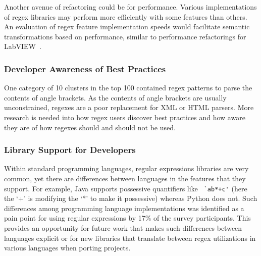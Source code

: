 Another avenue of refactoring could be for performance. Various implementations of regex libraries may perform more efficiently with some features than others. An evaluation of regex feature implementation speeds would facilitate semantic transformations based on performance, similar to performance refactorings for LabVIEW~\cite{chambers2013smell, chambers2015impact}.



\subsubsection{Developer Awareness of Best Practices}
One category of 10 clusters in the top 100 contained regex patterns to parse the contents of angle brackets.  As the contents of angle brackets are usually unconstrained, regexes are a poor replacement for XML or HTML parsers.  More research is needed into how regex users discover best practices and how aware they are of how regexes should and should not be used.

\subsubsection{Library Support for Developers}
Within standard programming languages, regular expressions libraries are very common, yet there are  differences between languages in the features that they support. For example, Java supports possessive quantifiers like \verb! `ab*+c'! (here the `+' is modifying the `*' to make it possessive) whereas Python does not. Such differences among programming language implementations was identified as a pain point for using regular expressions by 17\% of the survey participants. This provides an opportunity for future work that makes such differences between languages explicit or for new libraries that translate between regex utilizations in various languages when porting projects.

